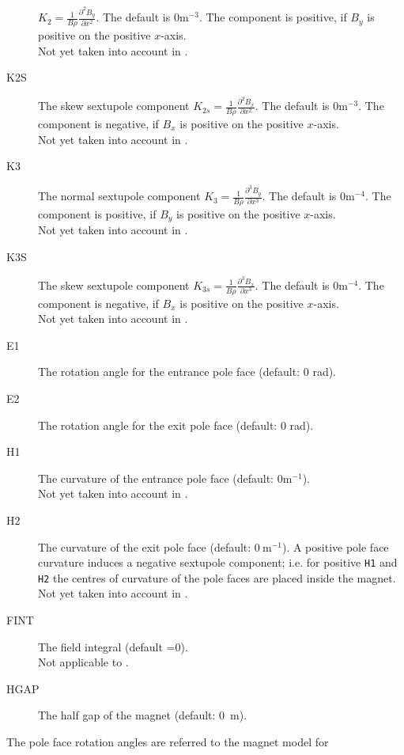 \begin{description}
  $K_2=\frac{1}{B \rho}\frac{\partial^2 B_y}{\partial x^2}$.
  The default is $0 \mathrm{m}^{-3}$.
  The component is positive, if $B_y$ is positive on the positive $x$-axis.\\
  Not yet taken into account in \opalt.
\item[K2S]
  The skew sextupole component
  $K_{2s}=\frac{1}{B \rho}\frac{\partial^2 B_x}{\partial x^2}$.
  The default is $0 \mathrm{m}^{-3}$.
  The component is negative, if $B_x$ is positive on the positive $x$-axis.\\
  Not yet taken into account in \opalt.
\item[K3]
  The normal sextupole component
  $K_3=\frac{1}{B \rho}\frac{\partial^3 B_y}{\partial x^3}$.
  The default is $0 \mathrm{m}^{-4}$.
  The component is positive, if $B_y$ is positive on the positive $x$-axis.\\
    Not yet taken into account in \opalt.
\item[K3S]
  The skew sextupole component
  $K_{3s}=\frac{1}{B \rho}\frac{\partial^3 B_x}{\partial x^3}$.
  The default is $0 \mathrm{m}^{-4}$.
  The component is negative, if $B_x$ is positive on the positive $x$-axis.\\
  Not yet taken into account in \opalt.
  \item[E1]
  The rotation angle for the entrance pole face
  (default: 0 rad).
\item[E2]
  The rotation angle for the exit pole face
  (default: 0 rad).
\item[H1]
  The curvature of the entrance pole face (default: $0 \mathrm{m}^{-1}$).\\
  Not yet taken into account in \opalt.
  \item[H2]
  The curvature of the exit pole face (default: $0~\mathrm{m}^{-1}$).
  A positive pole face curvature induces a negative sextupole component;
  i.e. for positive \texttt{H1} and \texttt{H2}
  the centres of curvature of the pole faces are placed inside the magnet.\\
  Not yet taken into account in \opalt.
  \item[FINT]
  The field integral (default =0).\\
  Not applicable to \opalt.
  \item[HGAP]
  The half gap of the magnet (default: 0~m).
\end{description}
The pole face rotation angles are referred to the magnet model for
